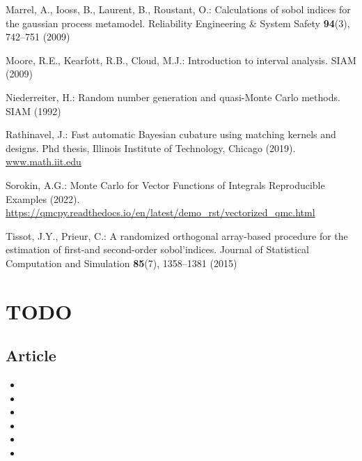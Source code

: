 \documentclass[graybox]{svmult}
\begin{document}
\begin{thebibliography}{10}
Marrel, A., Iooss, B., Laurent, B., Roustant, O.: Calculations of sobol indices
  for the gaussian process metamodel.
\newblock Reliability Engineering \& System Safety \textbf{94}(3), 742--751
  (2009)

Moore, R.E., Kearfott, R.B., Cloud, M.J.: Introduction to interval analysis.
\newblock SIAM (2009)

Niederreiter, H.: Random number generation and quasi-Monte Carlo methods.
\newblock SIAM (1992)

Rathinavel, J.: {F}ast automatic {B}ayesian cubature using matching kernels and
  designs.
\newblock Phd thesis, Illinois Institute of Technology, Chicago (2019).
\newblock \urlprefix\url{www.math.iit.edu}

Sorokin, A.G.: {M}onte {C}arlo for {V}ector {F}unctions of {I}ntegrals
  {R}eproducible {E}xamples (2022).
\newblock \urlprefix\url{https://qmcpy.readthedocs.io/en/latest/demo\_rst/vectorized\_qmc.html}

Tissot, J.Y., Prieur, C.: A randomized orthogonal array-based procedure for the
  estimation of first-and second-order sobol'indices.
\newblock Journal of Statistical Computation and Simulation \textbf{85}(7),
  1358--1381 (2015)

\end{thebibliography}


\iffalse
\section*{TODO}

\subsection*{Article}

\begin{itemize}
    \item {}
    \item {}
    \item {}
    \item {}
    \item {}
    \item {}
\end{itemize}
\end{document}
